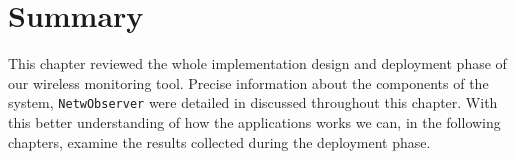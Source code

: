 \section{Summary}
This chapter reviewed the whole implementation design and deployment phase of our wireless monitoring tool. Precise information about the components of the system, \texttt{NetwObserver} were detailed in discussed throughout this chapter. With this better understanding of how the applications works we can, in the following chapters, examine the results collected during the deployment phase. 
